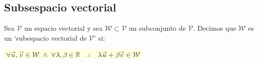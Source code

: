 \subsection{Subsespacio vectorial}

\begin{defi}
Sea $\mathcal V$ un espacio vectorial y sea $\mathcal W \subset \mathcal V$ un subconjunto de $\mathcal V$. Decimos que $\mathcal W$ es un `subespacio vectorial de $\mathcal V$' si:

\vspace{2mm}
\centerline{\colorbox{LightYellow}{$\boxed{\; \forall \vec u, \vec v \in \mathcal W \; \wedge \; \forall \lambda, \beta \in \mathbb R \quad \therefore \quad \lambda \vec u + \beta \vec v \in \mathcal W\; }$}}

\end{defi}

\justify

